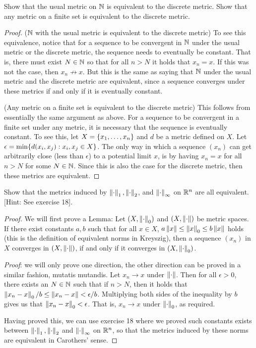 \begin{exercise}{43}
Show that the usual metric on $\mathbb{N}$ is equivalent to the discrete metric. Show that any metric on a finite set is equivalent to the discrete metric.
\end{exercise}
\begin{proof}
($\mathbb{N}$ with the usual metric is equivalent to the discrete metric) To see this equivalence, notice that for a sequence to be convergent in $\mathbb{N}$ under the usual metric or the discrete metric, the sequence needs to eventually be constant. That is, there must exist $N\in\mathbb{N}$ so that for all $n>N$ it holds that $x_n=x$. If this was not the case, then $x_n\not\to x$. But this is the same as saying that $\mathbb{N}$ under the usual metric and the discrete metric are equivalent, since a sequence converges under these metrics if and only if it is eventually constant.

(Any metric on a finite set is equivalent to the discrete metric) This follows from essentially the same argument as above. For a sequence to be convergent in a finite set under any metric, it is necessary that the sequence is eventually constant. To see this, let $X=\{x_1,\dots,x_n\}$ and $d$ be a metric defined on $X$. Let $\epsilon=\min\{d(x_i,x_j):x_i,x_j\in X\}$. The only way in which a sequence $(x_n)$ can get arbitrarily close (less than $\epsilon$) to a potential limit $x$, is by having $x_n=x$ for all $n>N$ for some 
$N\in\mathbb{N}$. Since this is also the case for the discrete metric, then these metrics are equivalent.
\end{proof} 

\begin{exercise}{44}
Show that the metrics induced by $\left\lVert \cdot\right\rVert_1,\left\lVert \cdot\right\rVert_2$, and $\left\lVert \cdot\right\rVert_\infty$ on $\mathbb{R}^n$ are all equivalent. [Hint: See exercise 18].
\end{exercise}
\begin{proof}
We will first prove a Lemma: Let $(X,\left\lVert \cdot\right\rVert_0)$ and $(X,\left\lVert \cdot\right\rVert)$ be metric spaces. If there exist constants $a,b$ such that for all $x\in X$, $a\left\lVert x\right\rVert \leq\left\lVert x\right\rVert_0 \leq b\left\lVert x\right\rVert$ holds (this is the definition of equivalent norms in Kreyszig), then a sequence $(x_n)$ in $X$ converges in $(X,\left\lVert \cdot\right\rVert)$, if and only if it converges in $(X,\left\lVert \cdot\right\rVert_0)$.

\textit{Proof}: we will only prove one direction, the other direction can be proved in a similar fashion, mutatis mutandis. Let $x_n\to x$ under $\left\lVert \cdot\right\rVert$. Then for all $\epsilon>0$, there exists an $N\in\mathbb{N}$ such that if $n>N$, then it holds that $\left\lVert x_n-x\right\rVert_0/b\leq\left\lVert x_n-x\right\rVert<\epsilon/b$. Multiplying both sides of the inequality by $b$ gives us that $\left\lVert x_n-x\right\rVert_0<\epsilon$. That is, $x_n\to x$ under $\left\lVert \cdot\right\rVert_0$, as required.

Having proved this, we can use exercise 18 where we proved such constants exists between $\left\lVert \cdot\right\rVert_1, \left\lVert \cdot\right\rVert_2$ and $\left\lVert \cdot\right\rVert_\infty$ on $\mathbb{R}^n$, so that the metrics induced by these norms are equivalent in Carothers' sense.
\end{proof} 

